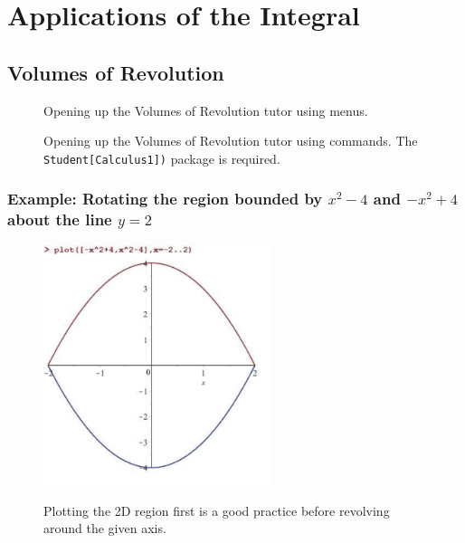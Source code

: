 \chapter{Applications of the Integral}
\label{chp:applications_of_the_Integral}			

\section{Volumes of Revolution}

\begin{figure}[h]
\caption{Opening up the Volumes of Revolution tutor using menus.}
\centering
{}
\end{figure}

\begin{figure}[h]
\caption{Opening up the Volumes of Revolution tutor using commands. The \texttt{Student[Calculus1])} package is required.}
\centering
{}
\end{figure}

\newpage

\subsection*{Example: Rotating the region bounded by $x^2-4$ and $-x^2+4$ about the line $y=2$}

\begin{figure}
\caption{Plotting the 2D region first is a good practice before revolving around the given axis.}
\centering
\includegraphics[width=0.6\textwidth]{tutorials/figures/VoRTutorQ0-1-eps-converted-to.pdf}\\
\end{figure}

